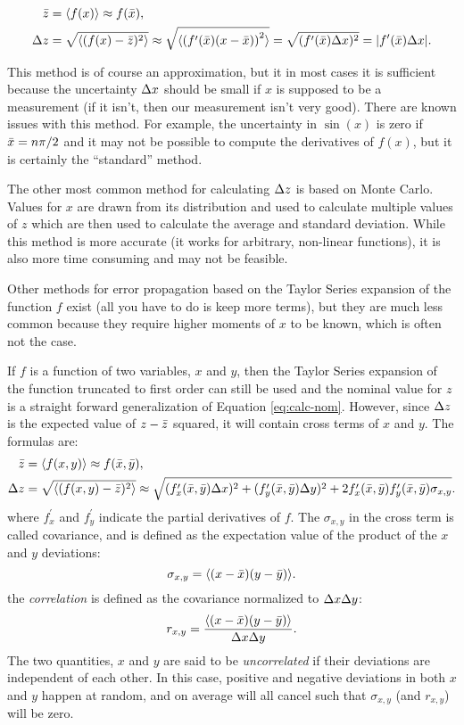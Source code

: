 \documentclass[letterpaper,10pt]{article}
\begin{document}
\begin{align*}
  \bar{z} &= \langle  f(x)  \rangle \approx f(\bar{x}), \\
  \Delta{z} &= \sqrt{ \langle  (f(x) - \bar{z})^2  \rangle } \approx \sqrt{ \langle  \left( f^\prime(\bar{x}) (x - \bar{x}) \right)^2  \rangle } = \sqrt{ (f^{\prime}(\bar{x}) \Delta{x})^2 } = | f^{\prime}(\bar{x}) \Delta{x} |.
\end{align*}

This method is of course an approximation, but it in most cases it is
sufficient because the uncertainty $\Delta{x}$ should be small if $x$ is supposed
to be a measurement (if it isn't, then our measurement isn't very good).  There
are known issues with this method. For example, the uncertainty in $\sin(x)$ is
zero if $\bar{x} = n\pi/2$ and it may not be possible to compute the
derivatives of $f(x)$, but it is certainly the ``standard'' method.

The other most common method for calculating $\Delta{z}$ is based on Monte Carlo.
Values for $x$ are drawn from its distribution and used to calculate multiple
values of $z$ which are then used to calculate the average and standard
deviation. While this method is more accurate (it works for arbitrary,
non-linear functions), it is also more time consuming and may not be feasible.

Other methods for error propagation based on the Taylor Series expansion of the function $f$ exist (all you have to do is keep more terms), but they are much less common because they require higher moments of $x$ to be known, which
is often not the case.

If $f$ is a function of two variables, $x$ and $y$, then the Taylor Series expansion of the function truncated to first order can still be used and the nominal value for $z$ is a straight forward generalization of Equation \ref{eq:calc-nom}.
However, since $\Delta{z}$ is the expected value of $z - \bar{z}$ squared, it will contain cross terms of $x$ and $y$. The formulas are:
\begin{align}
  \bar{z} &= \langle  f(x,y)  \rangle \approx f(\bar{x},\bar{y}), \\
  \Delta{z} &= \sqrt{ \langle  (f(x,y) - \bar{z})^2  \rangle } \approx \sqrt{ (f^{\prime}_x(\bar{x},\bar{y}) \Delta{x})^2 + (f^{\prime}_y(\bar{x},\bar{y}) \Delta{y})^2 + 2f^{\prime}_{x}(\bar{x},\bar{y})f^{\prime}_{y}(\bar{x},\bar{y})\sigma_{x,y} }.
  \label{eq:calc-unc}
\end{align}
where $f^\prime_x$ and $f^\prime_y$ indicate the partial derivatives of $f$. The $\sigma_{x,y}$ in the cross term is called covariance, and is defined as the expectation value of the product of the $x$ and $y$ deviations:
$$
\sigma_{x,y} = \langle  (x-\bar{x})(y-\bar{y})  \rangle.
$$
the \emph{correlation} is defined as the covariance normalized to $\Delta{x}\Delta{y}$:
$$
\label{correlation}
r_{x,y} = \frac{ \langle  (x-\bar{x})(y-\bar{y})  \rangle }{\Delta{x}\Delta{y}}.
$$
The two quantities, $x$ and $y$ are said to be \emph{uncorrelated} if their deviations are independent of each other. In this case, positive and negative deviations in both $x$ and $y$ happen at random, and on average will all cancel
such that $\sigma_{x,y}$ (and $r_{x,y}$) will be zero.
\end{document}
